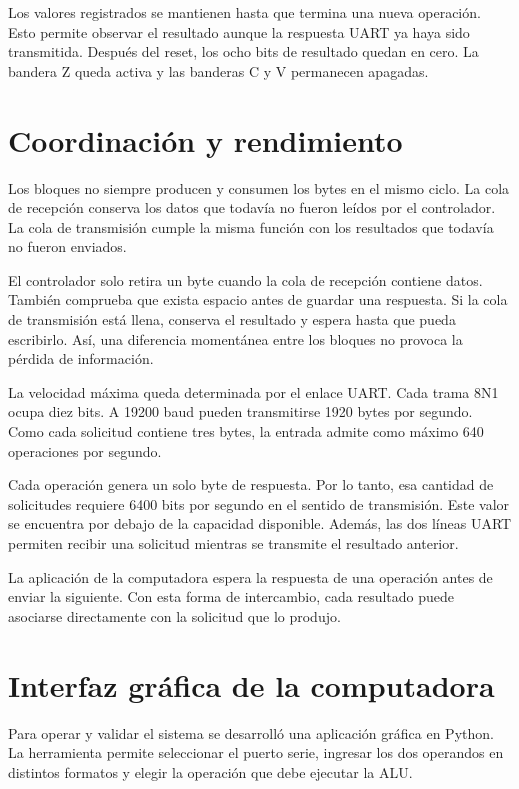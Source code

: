 Los valores registrados se mantienen hasta que termina una nueva
operación. Esto permite observar el resultado aunque la respuesta
UART ya haya sido transmitida. Después del reset, los ocho bits de
resultado quedan en cero. La bandera Z queda activa y las banderas C
y V permanecen apagadas.

\section{Coordinación y rendimiento}

Los bloques no siempre producen y consumen los bytes en el mismo
ciclo. La cola de recepción conserva los datos que todavía no fueron
leídos por el controlador. La cola de transmisión cumple la misma
función con los resultados que todavía no fueron enviados.

El controlador solo retira un byte cuando la cola de recepción
contiene datos. También comprueba que exista espacio antes de guardar
una respuesta. Si la cola de transmisión está llena, conserva el
resultado y espera hasta que pueda escribirlo. Así, una diferencia
momentánea entre los bloques no provoca la pérdida de información.

La velocidad máxima queda determinada por el enlace UART. Cada trama
8N1 ocupa diez bits. A \num{19200} baud pueden transmitirse
\num{1920} bytes por segundo. Como cada solicitud contiene tres
bytes, la entrada admite como máximo \num{640} operaciones por segundo.

Cada operación genera un solo byte de respuesta. Por lo tanto, esa
cantidad de solicitudes requiere \num{6400} bits por segundo en el
sentido de transmisión. Este valor se encuentra por debajo de la
capacidad disponible. Además, las dos líneas UART permiten recibir
una solicitud mientras se transmite el resultado anterior.

La aplicación de la computadora espera la respuesta de una operación
antes de enviar la siguiente. Con esta forma de intercambio, cada
resultado puede asociarse directamente con la solicitud que lo produjo.

\section{Interfaz gráfica de la computadora}

Para operar y validar el sistema se desarrolló una aplicación gráfica
en Python. La herramienta permite seleccionar el puerto serie,
ingresar los dos operandos en distintos formatos y elegir la
operación que debe ejecutar la ALU.

